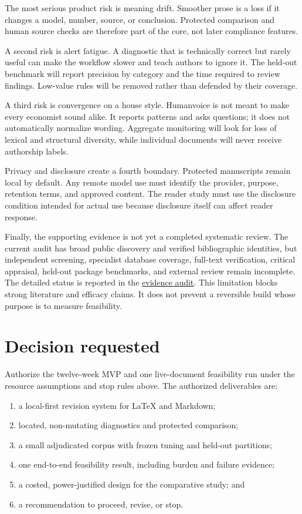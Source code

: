\documentclass[
  11pt,
  english,
]{article}
\providecommand{\tightlist}{%
  \setlength{\itemsep}{0pt}\setlength{\parskip}{0pt}}
\begin{document}
The most serious product risk is meaning drift. Smoother prose is a loss
if it changes a model, number, source, or conclusion. Protected
comparison and human source checks are therefore part of the core, not
later compliance features.

A second risk is alert fatigue. A diagnostic that is technically correct
but rarely useful can make the workflow slower and teach authors to
ignore it. The held-out benchmark will report precision by category and
the time required to review findings. Low-value rules will be removed
rather than defended by their coverage.

A third risk is convergence on a house style. Humanvoice is not meant to
make every economist sound alike. It reports patterns and asks
questions; it does not automatically normalize wording. Aggregate
monitoring will look for loss of lexical and structural diversity, while
individual documents will never receive authorship labels.

Privacy and disclosure create a fourth boundary. Protected manuscripts
remain local by default. Any remote model use must identify the
provider, purpose, retention terms, and approved content. The reader
study must use the disclosure condition intended for actual use because
disclosure itself can affect reader response.

Finally, the supporting evidence is not yet a completed systematic
review. The current audit has broad public discovery and verified
bibliographic identities, but independent screening, specialist database
coverage, full-text verification, critical appraisal, held-out package
benchmarks, and external review remain incomplete. The detailed status
is reported in the \href{humanvoice_product_proposal_audit.md}{evidence
audit}. This limitation blocks strong literature and efficacy claims. It
does not prevent a reversible build whose purpose is to measure
feasibility.

\hypertarget{decision-requested}{%
\section{Decision requested}\label{decision-requested}}

Authorize the twelve-week MVP and one live-document feasibility run
under the resource assumptions and stop rules above. The authorized
deliverables are:

\begin{enumerate}
\def\labelenumi{\arabic{enumi}.}
\tightlist
\item
  a local-first revision system for LaTeX and Markdown;
\item
  located, non-mutating diagnostics and protected comparison;
\item
  a small adjudicated corpus with frozen tuning and held-out partitions;
\item
  one end-to-end feasibility result, including burden and failure
  evidence;
\item
  a costed, power-justified design for the comparative study; and
\item
  a recommendation to proceed, revise, or stop.
\end{enumerate}
\end{document}
